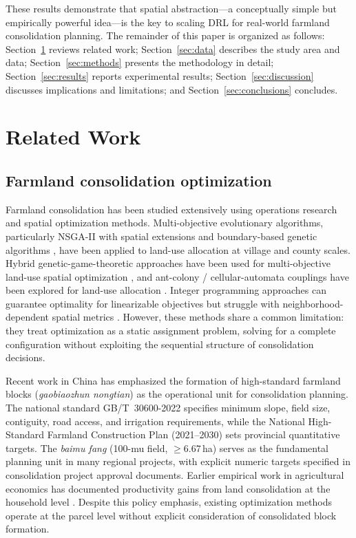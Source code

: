 \documentclass[preprint,12pt]{elsarticle}
\begin{document}
These results demonstrate that spatial abstraction---a conceptually simple but empirically powerful idea---is the key to scaling DRL for real-world farmland consolidation planning. The remainder of this paper is organized as follows: Section~\ref{sec:related} reviews related work; Section~\ref{sec:data} describes the study area and data; Section~\ref{sec:methods} presents the methodology in detail; Section~\ref{sec:results} reports experimental results; Section~\ref{sec:discussion} discusses implications and limitations; and Section~\ref{sec:conclusions} concludes.


\section{Related Work}
\label{sec:related}

\subsection{Farmland consolidation optimization}

Farmland consolidation has been studied extensively using operations research and spatial optimization methods. Multi-objective evolutionary algorithms, particularly NSGA-II \citep{deb2002fast} with spatial extensions \citep{cao2011sustainable} and boundary-based genetic algorithms \citep{cao2012spatial}, have been applied to land-use allocation at village and county scales. Hybrid genetic-game-theoretic approaches have been used for multi-objective land-use spatial optimization \citep{liu2012multi}, and ant-colony / cellular-automata couplings have been explored for land-use allocation \citep{li2011coupling}. Integer programming approaches can guarantee optimality for linearizable objectives but struggle with neighborhood-dependent spatial metrics \citep{aerts2003using}. However, these methods share a common limitation: they treat optimization as a static assignment problem, solving for a complete configuration without exploiting the sequential structure of consolidation decisions.

Recent work in China has emphasized the formation of high-standard farmland blocks (\textit{gaobiaozhun nongtian}) as the operational unit for consolidation planning. The national standard GB/T~30600-2022 \citep{gbt30600_2022} specifies minimum slope, field size, contiguity, road access, and irrigation requirements, while the National High-Standard Farmland Construction Plan (2021--2030) \citep{moa2021plan} sets provincial quantitative targets. The \textit{baimu fang} (100-mu field, $\geq$6.67\,ha) serves as the fundamental planning unit in many regional projects, with explicit numeric targets specified in consolidation project approval documents. Earlier empirical work in agricultural economics has documented productivity gains from land consolidation at the household level \citep{wu2005consolidation}. Despite this policy emphasis, existing optimization methods operate at the parcel level without explicit consideration of consolidated block formation.
\end{document}
